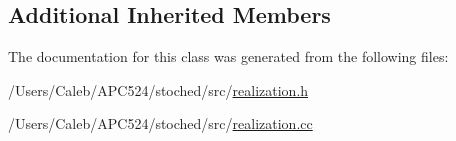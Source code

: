 \subsection*{Additional Inherited Members}


The documentation for this class was generated from the following files\+:\begin{DoxyCompactItemize}
\item 
/\+Users/\+Caleb/\+A\+P\+C524/stoched/src/\hyperlink{realization_8h}{realization.\+h}\item 
/\+Users/\+Caleb/\+A\+P\+C524/stoched/src/\hyperlink{realization_8cc}{realization.\+cc}\end{DoxyCompactItemize}
